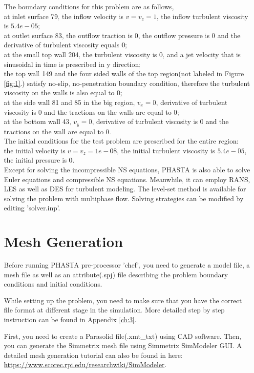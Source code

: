 \documentclass{article}
\begin{document}
The boundary conditions for this problem are as follows,\\
at inlet surface 79, the inflow velocity is $v = v_z= 1$, the inflow turbulent viscosity is $5.4e-05$;\\
at outlet surface 83, the outflow traction is $0$, the outflow pressure is $0$ and the derivative of turbulent viscosity equals $0$; \\
at the small top wall 204, the turbulent viscosity is $0$, and a jet velocity that is sinusoidal in time is prescribed in y direction; \\
the top wall 149 and the four sided walls of the top region(not labeled in Figure \ref{fig:1}.) satisfy no-slip, no-penetration boundary condition, therefore the turbulent viscosity on the walls is also equal to $0$;\\
at the side wall 81 and 85 in the big region, $v_x=0$, derivative of turbulent viscosity is $0$ and the tractions on the walls are equal to $0$;\\
at the bottom wall 43, $v_y=0$, derivative of turbulent viscosity is $0$ and the tractions on the wall are equal to $0$.\\
The initial conditions for the test problem are prescribed for the entire region: the initial velocity is $v = v_z = 1e-08$, the initial turbulent viscosity is $5.4e-05$, the initial pressure is $0$. \\ 

Except for solving the incompressible NS equations, PHASTA is also able to solve Euler equations and compressible NS equations. Meanwhile, it can employ RANS, LES as well as DES for turbulent modeling. The level-set method is available for solving the problem with multiphase flow. Solving strategies can be modified by editing 'solver.inp'.

\section{Mesh Generation}

Before running PHASTA pre-processor 'chef', you need to generate a model file, a mesh file as well as an attribute(.spj) file describing the problem boundary conditions and initial conditions.

While setting up the problem, you need to make sure that you have the correct file format at different stage in the simulation. More detailed step by step instruction can be found in Appendix \ref{ch:3}.

First, you need to create a Parasolid file(.xmt\_txt) using CAD software. Then, you can generate the Simmetrix mesh file using Simmetrix SimModeler GUI. A detailed mesh generation tutorial can also be found in here:\\
\url{https://www.scorec.rpi.edu/researchwiki/SimModeler}.
\end{document}
